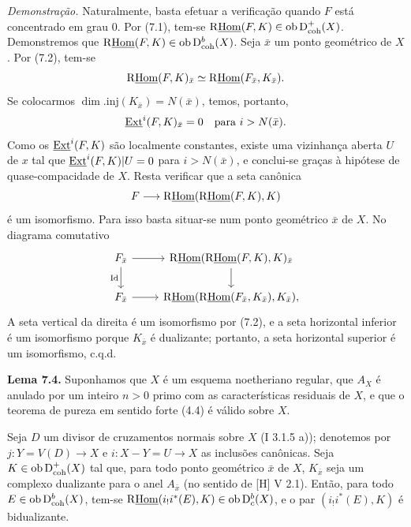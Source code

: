 \emph{Demonstração.} Naturalmente, basta efetuar a verificação quando $F$ está concentrado em grau $0$. Por (7.1), tem-se $\mathrm{R}\underline{\operatorname{Hom}}(F,K)\in\operatorname{ob}\mathrm{D}^{+}_{\mathrm{coh}}(X)$. Demonstremos que $\mathrm{R}\underline{\operatorname{Hom}}(F,K)\in\operatorname{ob}\mathrm{D}^{b}_{\mathrm{coh}}(X)$. Seja $\bar{x}$ um ponto geométrico de $X$. Por (7.2), tem-se
\[
        \mathrm{R}\underline{\operatorname{Hom}}(F,K)_{\bar{x}}\simeq \mathrm{R}\underline{\operatorname{Hom}}(F_{\bar{x}},K_{\bar{x}}).
\]
Se colocarmos $\dim.\mathrm{inj}(K_{\bar{x}})=N(\bar{x})$, temos, portanto,
\[
        \underline{\operatorname{Ext}}^i(F,K)_{\bar{x}}=0\quad\hbox{para }i>N(\bar{x}).
\]
Como os $\underline{\operatorname{Ext}}^{i}(F,K)$ são localmente constantes, existe uma vizinhança aberta $U$ de $x$ tal que $\underline{\operatorname{Ext}}^{i}(F,K)|U=0$ para $i>N(\bar{x})$, e conclui-se graças à hipótese de quase-compacidade de $X$. Resta verificar que a seta canônica
\[
        F\longrightarrow \mathrm{R}\underline{\operatorname{Hom}}(\mathrm{R}\underline{\operatorname{Hom}}(F,K),K)
\]
é um isomorfismo. Para isso basta situar-se num ponto geométrico $\bar{x}$ de $X$. No diagrama comutativo
\[
\begin{tikzcd}
F_{\bar{x}} \arrow[r] \arrow[d,"\mathrm{Id}"'] & \R\underline{\Hom}(\R\underline{\Hom}(F,K),K)_{\bar{x}} \arrow[d]\\
F_{\bar{x}} \arrow[r] & \R\underline{\Hom}(\R\underline{\Hom}(F_{\bar{x}},K_{\bar{x}}),K_{\bar{x}}),
\end{tikzcd}
\]
A seta vertical da direita é um isomorfismo por (7.2), e a seta horizontal inferior é um isomorfismo porque $K_{\bar{x}}$ é dualizante; portanto, a seta horizontal superior é um isomorfismo, c.q.d.

\textbf{Lema 7.4.} Suponhamos que $X$ é um esquema noetheriano regular, que $A_X$ é anulado por um inteiro $n>0$ primo com as características residuais de $X$, e que o teorema de pureza em sentido forte (4.4) é válido sobre $X$.

Seja $D$ um divisor de cruzamentos normais sobre $X$ (I 3.1.5 a)); denotemos por $j:Y=V(D)\to X$ e $i:X-Y=U\to X$ as inclusões canônicas. Seja $K\in\operatorname{ob}\mathrm{D}^{+}_{\mathrm{coh}}(X)$ tal que, para todo ponto geométrico $\bar{x}$ de $X$, $K_{\bar{x}}$ seja um complexo dualizante para o anel $A_{\bar{x}}$ (no sentido de [H] V 2.1). Então, para todo $E\in\operatorname{ob}\mathrm{D}^{b}_{\mathrm{coh}}(X)$, tem-se $\mathrm{R}\underline{\operatorname{Hom}}(i_!i^*(E),K)\in\operatorname{ob}\mathrm{D}^{b}_{c}(X)$, e o par $(i_!i^*(E),K)$ é bidualizante.

